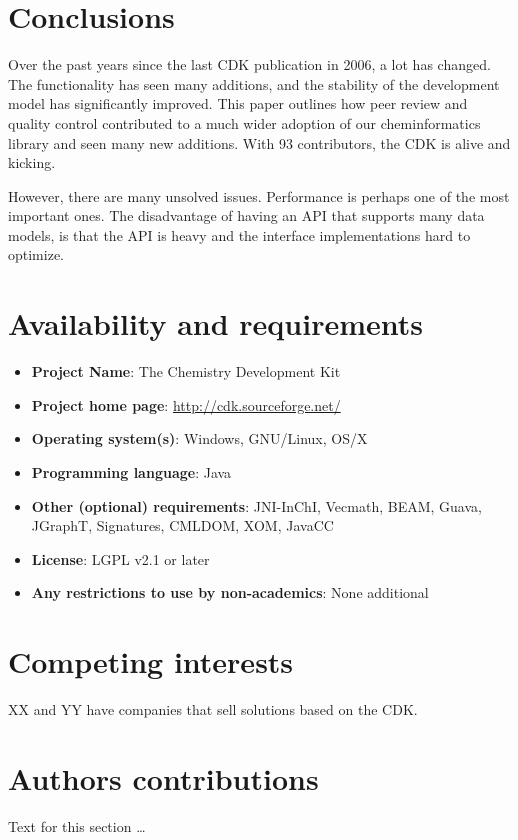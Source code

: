 \documentclass[10pt]{bmc_article}
\newenvironment{bmcformat}{\begin{raggedright}\baselineskip20pt\sloppy\setboolean{publ}{false}}{\end{raggedright}\baselineskip20pt\sloppy}
\begin{document}
\begin{bmcformat}
\section*{Conclusions}

Over the past years since the last CDK publication in 2006, a lot has changed. The functionality
has seen many additions, and the stability of the development model has significantly improved.
This paper outlines how peer review and quality control contributed to a much wider adoption
of our cheminformatics library and seen many new additions. With 93 contributors,
the CDK is alive and kicking.

However, there are many unsolved issues. Performance is perhaps one of the most important ones.
The disadvantage of having an API that supports many data models, is that the API is heavy and
the interface implementations hard to optimize.

\section*{Availability and requirements}

\begin{itemize}
\item \textbf{Project Name}: The Chemistry Development Kit
\item \textbf{Project home page}: \url{http://cdk.sourceforge.net/}
\item \textbf{Operating system(s)}: Windows, GNU/Linux, OS/X
\item \textbf{Programming language}: Java
\item \textbf{Other (optional) requirements}: JNI-InChI, Vecmath, BEAM, Guava, JGraphT, Signatures, CMLDOM, XOM, JavaCC
\item \textbf{License}: LGPL v2.1 or later
\item \textbf{Any restrictions to use by non-academics}: None additional
\end{itemize}

\section*{Competing interests}
XX and YY have companies that sell solutions based on the CDK.

\section*{Authors contributions}
    Text for this section \ldots


\end{bmcformat}
\end{document}
